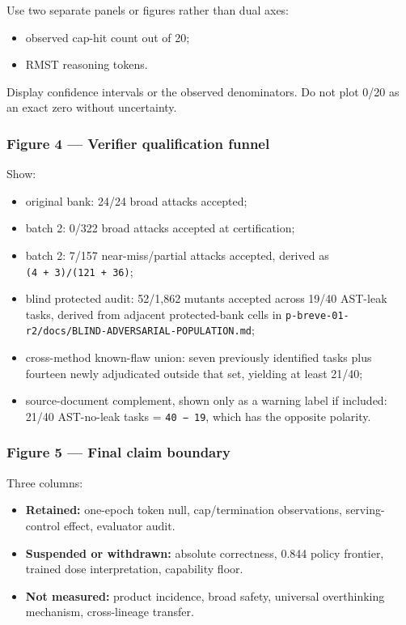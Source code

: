 \documentclass[
  9pt,
  letterpaper,
]{article}
\providecommand{\tightlist}{%
  \setlength{\itemsep}{0pt}\setlength{\parskip}{0pt}}
\begin{document}
Use two separate panels or figures rather than dual axes:

\begin{itemize}
\tightlist
\item
  observed cap-hit count out of 20;
\item
  RMST reasoning tokens.
\end{itemize}

Display confidence intervals or the observed denominators. Do not plot
0/20 as an exact zero without uncertainty.

\hypertarget{figure-4--verifier-qualification-funnel}{%
\subsubsection{Figure 4 --- Verifier qualification
funnel}\label{figure-4--verifier-qualification-funnel}}

Show:

\begin{itemize}
\tightlist
\item
  original bank: 24/24 broad attacks accepted;
\item
  batch 2: 0/322 broad attacks accepted at certification;
\item
  batch 2: 7/157 near-miss/partial attacks accepted, derived as
  \texttt{(4\ +\ 3)/(121\ +\ 36)};
\item
  blind protected audit: 52/1,862 mutants accepted across 19/40 AST-leak
  tasks, derived from adjacent protected-bank cells in
  \texttt{p-breve-01-r2/docs/BLIND-ADVERSARIAL-POPULATION.md};
\item
  cross-method known-flaw union: seven previously identified tasks plus
  fourteen newly adjudicated outside that set, yielding at least 21/40;
\item
  source-document complement, shown only as a warning label if included:
  21/40 AST-no-leak tasks = \texttt{40\ −\ 19}, which has the opposite
  polarity.
\end{itemize}

\hypertarget{figure-5--final-claim-boundary}{%
\subsubsection{Figure 5 --- Final claim
boundary}\label{figure-5--final-claim-boundary}}

Three columns:

\begin{itemize}
\tightlist
\item
  \textbf{Retained:} one-epoch token null, cap/termination observations,
  serving-control effect, evaluator audit.
\item
  \textbf{Suspended or withdrawn:} absolute correctness, 0.844 policy
  frontier, trained dose interpretation, capability floor.
\item
  \textbf{Not measured:} product incidence, broad safety, universal
  overthinking mechanism, cross-lineage transfer.
\end{itemize}
\end{document}

